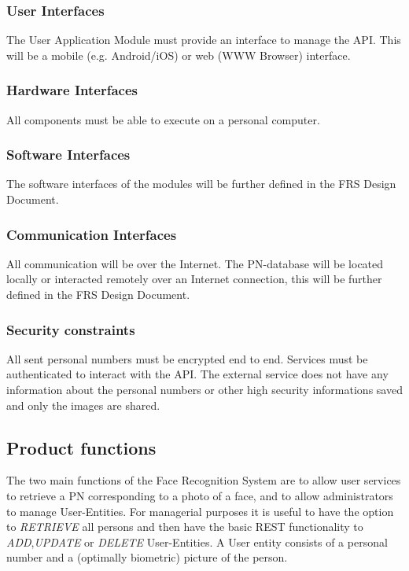\documentclass[a4paper,11pt]{article}
\begin{document}
\subsubsection{User Interfaces} \label{User_Interfaces}
The User Application Module must provide an interface to manage the API. This will be a mobile (e.g. Android/iOS) or web (WWW Browser) interface.
\subsubsection{Hardware Interfaces}
All components must be able to execute on a personal computer.

\subsubsection{Software Interfaces}
The software interfaces of the modules will be further defined in the FRS Design Document.

\subsubsection{Communication Interfaces}
All communication will be over the Internet.
The PN-database will be located locally or interacted remotely over an Internet connection, this will be further defined in the FRS Design Document.

\subsubsection{Security constraints}
All sent personal numbers must be encrypted end to end. Services must be authenticated to interact with the API. The external service does not have any information about the personal numbers or other high security informations saved and only the images are shared.

\subsection{Product functions} \label{ReqProductFunctions}
The two main functions of the Face Recognition System are to allow user services to retrieve a PN corresponding to a photo of a face, and to allow administrators to manage User-Entities.
\newline
\noindent
For managerial purposes it is useful to have the option to \textit{RETRIEVE} all persons and then have the basic REST functionality to \textit{ADD},\textit{UPDATE} or \textit{DELETE} User-Entities. A User entity consists of a personal number and a (optimally biometric) picture of the person.
\end{document}
